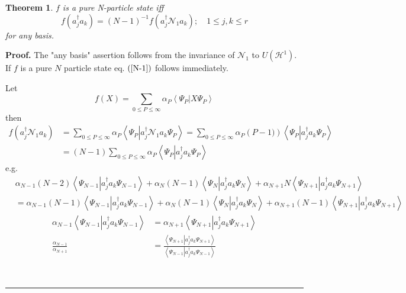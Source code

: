 \documentclass[aps,preprint]{revtex4}%
\newtheorem{theorem}{Theorem}
\newenvironment{proof}[1][Proof]{\noindent\textbf{#1.} }{\ \rule{0.5em}{0.5em}}
\begin{document}
\begin{theorem}
$f$ is a pure N-particle state iff
\begin{equation}
f\left(  a_{j}^{\dagger}a_{k}\right)  =\left(  N-1\right)  ^{-1}f\left(
a_{j}^{\dagger}\mathcal{N}_{1}a_{k}\right)  ;\quad1\leq j,k\leq r \label{N-1}%
\end{equation}
for any basis.
\end{theorem}

\begin{proof}
The "any basis" assertion follows from the invariance of $\mathcal{N}_{1}$ to
$U\left(  \mathcal{H}^{1}\right)  .$ If $f$ is a pure $N$ particle state eq.
$\left(  \ref{N-1}\right)  $ follows immediately.

Let
\begin{equation}
f\left(  X\right)  =\sum_{0\leq P\leq\infty}\alpha_{P}\left\langle \Psi
_{P}\left\vert X\Psi_{P}\right.  \right\rangle
\end{equation}
then
\begin{align}
f\left(  a_{j}^{\dagger}\mathcal{N}_{1}a_{k}\right)   &  =\sum_{0\leq
P\leq\infty}\alpha_{P}\left\langle \Psi_{P}\left\vert a_{j}^{\dagger
}\mathcal{N}_{1}a_{k}\Psi_{P}\right.  \right\rangle =\sum_{0\leq P\leq\infty
}\alpha_{P}\left(  P-1)\right)  \left\langle \Psi_{P}\left\vert a_{j}%
^{\dagger}a_{k}\Psi_{P}\right.  \right\rangle \nonumber\\
&  =\left(  N-1\right)  \sum_{0\leq P\leq\infty}\alpha_{P}\left\langle
\Psi_{P}\left\vert a_{j}^{\dagger}a_{k}\Psi_{P}\right.  \right\rangle
\end{align}
e.g.%
\begin{align}
&  \alpha_{N-1}(N-2)\left\langle \Psi_{N-1}\left\vert a_{j}^{\dagger}a_{k}%
\Psi_{N-1}\right.  \right\rangle +\alpha_{N}(N-1)\left\langle \Psi
_{N}\left\vert a_{j}^{\dagger}a_{k}\Psi_{N}\right.  \right\rangle
+\alpha_{N+1}N\left\langle \Psi_{N+1}\left\vert a_{j}^{\dagger}a_{k}\Psi
_{N+1}\right.  \right\rangle \nonumber\\
&  =\alpha_{N-1}(N-1)\left\langle \Psi_{N-1}\left\vert a_{j}^{\dagger}%
a_{k}\Psi_{N-1}\right.  \right\rangle +\alpha_{N}(N-1)\left\langle \Psi
_{N}\left\vert a_{j}^{\dagger}a_{k}\Psi_{N}\right.  \right\rangle
+\alpha_{N+1}\left(  N-1\right)  \left\langle \Psi_{N+1}\left\vert
a_{j}^{\dagger}a_{k}\Psi_{N+1}\right.  \right\rangle
\end{align}%
\begin{align}
\alpha_{N-1}\left\langle \Psi_{N-1}\left\vert a_{j}^{\dagger}a_{k}\Psi
_{N-1}\right.  \right\rangle  &  =\alpha_{N+1}\left\langle \Psi_{N+1}%
\left\vert a_{j}^{\dagger}a_{k}\Psi_{N+1}\right.  \right\rangle \nonumber\\
\frac{\alpha_{N-1}}{\alpha_{N+1}}  &  =\frac{\left\langle \Psi_{N+1}\left\vert
a_{j}^{\dagger}a_{k}\Psi_{N+1}\right.  \right\rangle }{\left\langle \Psi
_{N-1}\left\vert a_{j}^{\dagger}a_{k}\Psi_{N-1}\right.  \right\rangle }%
\end{align}

\end{proof}
\end{document}

